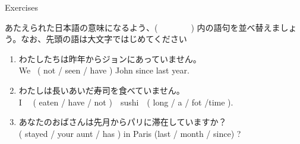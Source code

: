 \documentclass[aspectratio=169,xcolor={dvipsnames,table}]{beamer}
\newcommand{\myaudio}[1]{\href{#1}{\faVolumeUp}}
\begin{document}
\begin{frame}[plain]{Exercises}
 
あたえられた日本語の意味になるよう、(~~~~~~~~) 内の語句を並べ替えましょう。なお、先頭の語は大文字ではじめてください\mbox{}\hfill\myaudio{./audio/012_have_pp_keizoku_09.mp3}


\begin{enumerate}
 \item {\small わたしたちは昨年からジョンにあっていません。}\\
We  ~( not / seen / have ) John since last year.\\
 \item  {\small わたしは長いあいだ寿司を食べていません。\\
I ~~( eaten /  have / not )~~sushi~~( }long / a / fot /time ).\\
 \item  {\small あなたのおばさんは先月からパリに滞在していますか}？\bcdfrance\\
( stayed /  your aunt / has ) in Paris (last / month / since) ? \\
\end{enumerate}
\end{frame}
\end{document}
